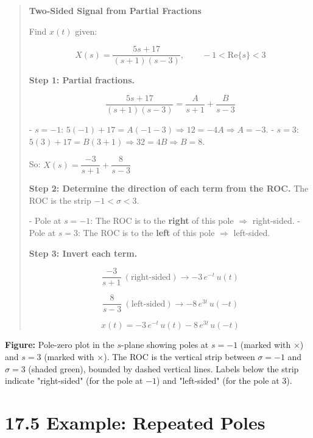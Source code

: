 \documentclass[11pt]{article}
\begin{document}
\begin{quote}
\textbf{Two-Sided Signal from Partial Fractions}

Find $x(t)$ given:

\[X(s) = \frac{5s+17}{(s+1)(s-3)}, \qquad -1 < \text{Re}\{s\} < 3\]

\textbf{Step 1: Partial fractions.}

\[\frac{5s+17}{(s+1)(s-3)} = \frac{A}{s+1} + \frac{B}{s-3}\]

- $s = -1$: $5(-1)+17 = A(-1-3) \Rightarrow 12 = -4A \Rightarrow A = -3$.
- $s = 3$: $5(3)+17 = B(3+1) \Rightarrow 32 = 4B \Rightarrow B = 8$.

So: $X(s) = \dfrac{-3}{s+1} + \dfrac{8}{s-3}$

\textbf{Step 2: Determine the direction of each term from the ROC.}
The ROC is the strip $-1 < \sigma < 3$.

- Pole at $s = -1$: The ROC is to the \textbf{right} of this pole $\Rightarrow$ right-sided.
- Pole at $s = 3$: The ROC is to the \textbf{left} of this pole $\Rightarrow$ left-sided.

\textbf{Step 3: Invert each term.}

\[\frac{-3}{s+1}\ (\text{right-sided}) \longrightarrow -3\, e^{-t}\, u(t)\]

\[\frac{8}{s-3}\ (\text{left-sided}) \longrightarrow -8\, e^{3t}\, u(-t)\]

\[\boxed{x(t) = -3\, e^{-t}\, u(t) - 8\, e^{3t}\, u(-t)}\]
\end{quote}

\textbf{Figure:} Pole-zero plot in the $s$-plane showing poles at $s = -1$ (marked with $\times$) and $s = 3$ (marked with $\times$). The ROC is the vertical strip between $\sigma = -1$ and $\sigma = 3$ (shaded green), bounded by dashed vertical lines. Labels below the strip indicate "right-sided" (for the pole at $-1$) and "left-sided" (for the pole at $3$).

\section*{17.5 Example: Repeated Poles}
\end{document}
